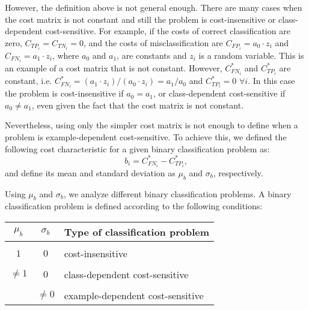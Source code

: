 {{  However, the definition above is not general enough. There are many cases when the cost matrix 
  is not constant and still the problem is cost-insensitive or class-dependent cost-sensitive. 
  For example, if the costs of correct classification are zero, $C_{TP_i}=C_{TN_i}=0$, 
  and the costs of misclassification are $C_{FP_i}=a_0\cdot z_i$ and $C_{FN_i}=a_1\cdot z_i$,
  where $a_0$ and $a_1$, are constants and $z_i$ is a random variable. This is an example of a cost 
  matrix that is not constant. However, $C^*_{FN_i}$ and $C^*_{TP_i}$ are constant, i.e. 
  $C^*_{FN_i}=(a_1\cdot z_i)/(a_0\cdot z_i)=a_1/a_0$ and $C^*_{TP_i}=0$ $\forall i$. In 
  this case the problem is cost-insensitive if $a_0=a_1$, or class-dependent cost-sensitive if 
  $a_0 \ne a_1$, even given the fact that the cost matrix is not constant.

  Nevertheless, using only the simpler cost matrix is not enough to define when a problem is 
  example-dependent cost-sensitive. To achieve this, we defined the following cost characteristic 
for a given binary classification problem as:
  \begin{equation}
    b_i = C^*_{FN_i}-C^*_{TP_i},
  \end{equation}
  and define its mean and standard deviation as $\mu_b$ and $\sigma_b$, respectively.

  Using $\mu_b$ and $\sigma_b$, we analyze different binary classification problems. 
%   
  A binary classification problem is defined according to the following conditions:
  \begin{center}
    \footnotesize
    \begin{tabular}{c | c | l}
      $\mu_b$ & $\sigma_b$ & Type of classification problem \\
      \hline 
      && \\
      $1$ &  $0$ & cost-insensitive \\ &&\\
      $\ne 1$ & $0$ & class-dependent cost-sensitive \\ &&\\
      & $\ne 0$ & example-dependent cost-sensitive \\ 
    \end{tabular}
  \end{center}
  

}}
